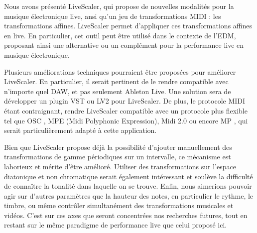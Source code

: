 Nous avons présenté LiveScaler, qui propose de nouvelles modalités pour la musique électronique live, ansi qu'un jeu de transformations MIDI : les transformations affines.  Live\-Scaler permet d'appliquer ces transformations affines en live. En particulier, cet outil peut être utilisé dans le contexte de l'EDM, proposant ainsi une alternative ou un complément pour la performance live en musique électronique.

Plusieurs améliorations techniques pourraient être proposées pour améliorer LiveScaler. En particulier, il serait pertinent de le rendre compatible avec n'importe quel DAW, et pas seulement Ableton Live. Une solution sera de  développer un plugin VST ou LV2 pour LiveScaler. De plus, le protocole MIDI étant contraignant, rendre LiveScaler compatible avec un protocole plus flexible tel que OSC \cite{wright2005open}, MPE (Midi Polyphonic Expression), Midi 2.0 ou encore  MP \cite{goudard2017mapping}, qui serait particulièrement adapté à cette application.

Bien que LiveScaler propose déjà la possibilité d'ajouter manuellement des transformations de gamme périodiques sur un intervalle, ce mécanisme est laborieux et mérite d'être amélioré. Utiliser des transformations sur l'espace diatonique et non chromatique serait également intéressant et soulève la difficulté de connaître la tonalité dans laquelle on se trouve. Enfin, nous aimerions pouvoir agir sur d'autres paramètres que la hauteur des notes, en particulier le rythme, le timbre, ou même contrôler simultanément des transformations musicales et vidéos. C'est sur ces axes que seront concentrées nos recherches futures, tout en restant sur le même paradigme de performance live que celui proposé ici.

